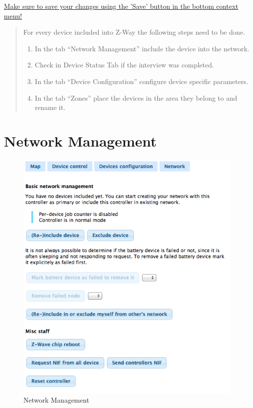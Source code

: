\underline{Make sure to save your changes using the 'Save' button in the bottom context menu!}

\begin{quote} {\bf 

For every device included into Z-Way the following steps need to be done.
\begin{enumerate}
\item In the tab “Network Management” include the device into the network. 
\item Check in Device Status Tab if the interview was completed.
\item In the tab “Device Configuration” configure device specific parameters. 
\item In the tab “Zones” place the devices in the area they belong to and rename it. 
\end{enumerate}
}
\end{quote}


\section{Network Management}

 
\begin{figure} 
\begin{center}
\includegraphics[scale=0.5]{pics/network1.png}
\caption{Network Management}
 
\end{center} 
\end{figure}


